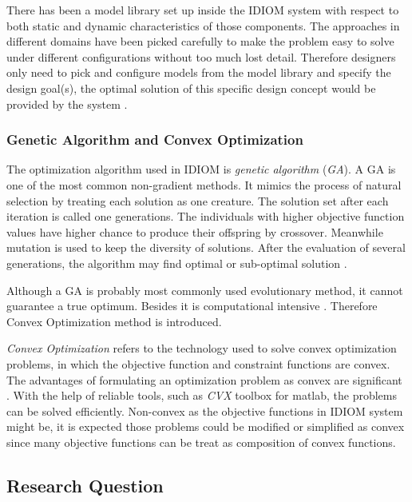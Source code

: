 There has been a model library set up inside the IDIOM system with respect to both static and dynamic characteristics of those components. The approaches in different domains have been picked carefully to make the problem easy to solve under different configurations without too much lost detail. Therefore designers only need to pick and configure models from the model library and specify the design goal(s), the optimal solution of this specific design concept would be provided by the system \cite{Holistic}. 

\subsubsection{Genetic Algorithm and Convex Optimization}

The optimization algorithm used in IDIOM is \textit{genetic algorithm} (\textit{GA}). A GA is one of the most common non-gradient methods. It mimics the process of natural selection by treating each solution as one creature. The solution set after each iteration  is called one generations. The individuals with higher objective function values have higher chance to produce their offspring by crossover. Meanwhile mutation is used to keep the diversity of solutions.  After the evaluation of several generations, the algorithm may find optimal or sub-optimal solution \cite{Nongradient}.

Although a GA is probably most commonly used evolutionary method, it cannot guarantee a true optimum. Besides it is computational intensive \cite{Roos}. Therefore Convex Optimization method is introduced.

\textit{Convex Optimization} refers to the technology used to solve convex optimization problems, in which the objective function and constraint functions are convex. The advantages of formulating an optimization problem as convex are significant \cite{Convex}. With the help of reliable tools, such as \textit{CVX} toolbox \cite{CVXtool} for matlab, the problems can be solved efficiently. Non-convex as the objective functions in IDIOM system might be, it is expected those problems could be modified or simplified as convex since many objective functions can be treat as composition of convex functions.

\subsection{Research Question}
